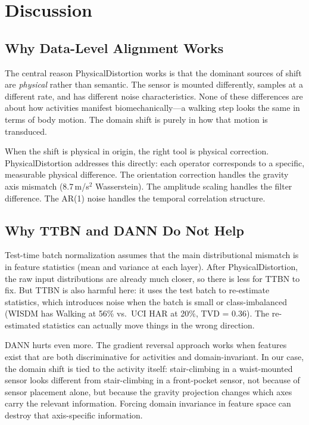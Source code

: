 \documentclass[12pt]{article}
\begin{document}
\section{Discussion}

\subsection{Why Data-Level Alignment Works}

The central reason PhysicalDistortion works is that the dominant sources of shift are \emph{physical} rather than semantic. The sensor is mounted differently, samples at a different rate, and has different noise characteristics. None of these differences are about how activities manifest biomechanically—a walking step looks the same in terms of body motion. The domain shift is purely in how that motion is transduced.

When the shift is physical in origin, the right tool is physical correction. PhysicalDistortion addresses this directly: each operator corresponds to a specific, measurable physical difference. The orientation correction handles the gravity axis mismatch (8.7\,m/s$^2$ Wasserstein). The amplitude scaling handles the filter difference. The AR(1) noise handles the temporal correlation structure.

\subsection{Why TTBN and DANN Do Not Help}

Test-time batch normalization assumes that the main distributional mismatch is in feature statistics (mean and variance at each layer). After PhysicalDistortion, the raw input distributions are already much closer, so there is less for TTBN to fix. But TTBN is also harmful here: it uses the test batch to re-estimate statistics, which introduces noise when the batch is small or class-imbalanced (WISDM has Walking at 56\% vs.\ UCI HAR at 20\%, TVD = 0.36). The re-estimated statistics can actually move things in the wrong direction.

DANN hurts even more. The gradient reversal approach works when features exist that are both discriminative for activities and domain-invariant. In our case, the domain shift is tied to the activity itself: stair-climbing in a waist-mounted sensor looks different from stair-climbing in a front-pocket sensor, not because of sensor placement alone, but because the gravity projection changes which axes carry the relevant information. Forcing domain invariance in feature space can destroy that axis-specific information.
\end{document}
